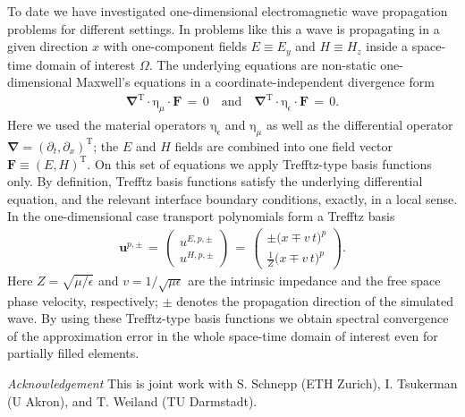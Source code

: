 \documentclass[article, A4, 11pt]{llncs}%
\begin{document}
To date we have investigated one-dimensional electromagnetic wave propagation problems for different settings. In problems like this a wave is propagating in a given direction $x$ with one-component fields $E\equiv E_y$ and $H\equiv H_z$ inside a space-time domain of interest $\Omega$. The underlying equations are non-static one-dimensional Maxwell's equations in a coordinate-independent divergence form
\begin{align} \label{eqn:1D-Maxwell-compact-form}  \mathbf{\nabla}^{\mathrm{T}} \cdot \mathrm{\eta}_\mu \cdot \mathbf{F} \,=\, 0 \quad \mathrm{and} \quad \mathbf{\nabla}^{\mathrm{T}} \cdot \mathrm{\eta}_\epsilon \cdot  \mathbf{F} \,=\, 0.\end{align} 
Here we used the material operators $\mathrm{\eta}_\epsilon $ and $\mathrm{\eta}_\mu$ as well as the differential operator $\mathbf{\nabla}=(\partial_t,\partial_x)^{\mathrm{T}}$; the $E$ and $H$ fields are combined into one field vector $\mathbf{F} \equiv (E,H)^{\mathrm{T}}$. On this set of equations we apply Trefftz-type basis functions only. By definition, Trefftz basis functions satisfy the underlying differential equation, and the relevant interface boundary conditions, exactly, in a local sense. In the one-dimensional case transport polynomials form a Trefftz basis
\begin{align}\label{eqn:transport-basis}  \mathbf{u}^{p,\pm} \, = \,   \left(\begin{array}{c}  u^{E,p,\pm} \\u^{H,p,\pm}  \end{array}\right) \, = \,  \left(\begin{array}{c}  \pm \big( x \mp v \, t \big)^p \\ \frac{1}{Z} \big( x \mp v \, t \big)^p  \end{array}\right).\end{align}  
Here $Z = \sqrt{\mu  / \epsilon}$ and $v = 1 / \sqrt{\mu \epsilon}$ are the intrinsic impedance and the free space phase velocity, respectively; $\pm$ denotes the propagation direction of the simulated wave. By using these Trefftz-type basis functions we obtain spectral convergence of the approximation error in the whole space-time domain of interest even for partially filled elements. 

\textit{Acknowledgement} This is joint work with S. Schnepp (ETH Zurich), I. Tsukerman (U Akron), and T. Weiland (TU Darmstadt).
\end{document}
